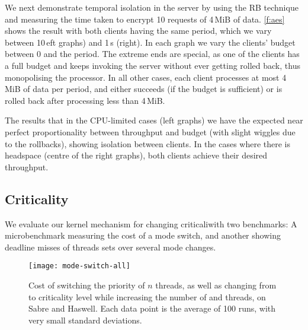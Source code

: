 We next demonstrate temporal isolation in the server by using the RB
technique and measuring the time taken to encrypt 10 requests of 4\,MiB of
data. \autoref{f:aes} shows the result with both clients having the same
period, which we vary between 10\,eft graphs) and 1\,s
(right). In each graph  we vary the clients' budget between 0 and the
period. The extreme ends are special, as one of the clients has a full
budget and keeps invoking the server without ever getting rolled back,
thus monopolising the processor. In all other cases, each client
processes at most 4\,MiB of data per period, and either succeeds (if
the budget is sufficient) or is rolled back after processing less than 4\,MiB.

The results that in the CPU-limited cases (left graphs)
we have the expected near perfect proportionality between throughput and
budget (with slight wiggles due to the rollbacks), showing isolation between clients. In the cases where there is headspace (centre of the right
graphs), both clients achieve their desired throughput.

\subsection{Criticality}

We evaluate our kernel mechanism for changing criticaliwith two benchmarks: A
microbenchmark measuring the cost of a mode switch, and another showing deadline misses of threads sets over several mode changes.

\begin{figure}[t]
  \centering
  \texttt{[image: mode-switch-all]}
  \caption{Cost of switching the priority of $n$ threads, as well as changing from  to
   criticality level while increasing the number of  and  threads,
  on Sabre and Haswell. Each data point is the average of 100 runs, with very small standard
  deviations.}
  \label{f:mode-switch}
\end{figure}

